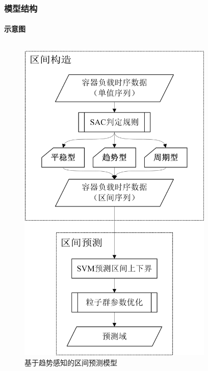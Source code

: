 \begin{frame}
\frametitle{模型结构}
\framesubtitle{示意图}
\begin{columns}
\begin{column}{0.4\textwidth}
\begin{figure}[htb]
\centering
\includegraphics[scale=0.3]{figures/fig6_sac-gpso-svm.jpg}
\caption{基于趋势感知的区间预测模型}
\label{fig:fig6}
\end{figure}
\end{column}
\begin{column}{0.6\textwidth}
\begin{figure}[htb]

\end{figure}
\end{column}
\end{columns}
\end{frame}
